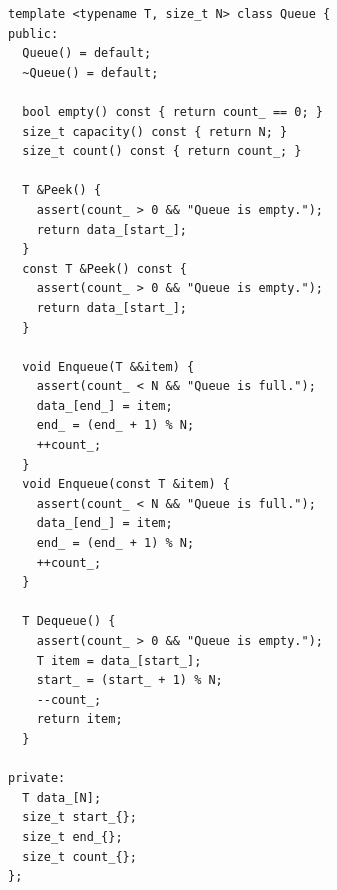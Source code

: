 \begin{verbatim}
template <typename T, size_t N> class Queue {
public:
  Queue() = default;
  ~Queue() = default;

  bool empty() const { return count_ == 0; }
  size_t capacity() const { return N; }
  size_t count() const { return count_; }

  T &Peek() {
    assert(count_ > 0 && "Queue is empty.");
    return data_[start_];
  }
  const T &Peek() const {
    assert(count_ > 0 && "Queue is empty.");
    return data_[start_];
  }

  void Enqueue(T &&item) {
    assert(count_ < N && "Queue is full.");
    data_[end_] = item;
    end_ = (end_ + 1) % N;
    ++count_;
  }
  void Enqueue(const T &item) {
    assert(count_ < N && "Queue is full.");
    data_[end_] = item;
    end_ = (end_ + 1) % N;
    ++count_;
  }

  T Dequeue() {
    assert(count_ > 0 && "Queue is empty.");
    T item = data_[start_];
    start_ = (start_ + 1) % N;
    --count_;
    return item;
  }

private:
  T data_[N];
  size_t start_{};
  size_t end_{};
  size_t count_{};
};
\end{verbatim}
